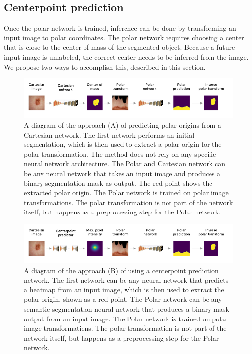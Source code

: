     \subsection{Centerpoint prediction}
    
Once the polar network is trained, inference can be done by transforming an input image to polar 
coordinates. The polar network requires choosing a center that is close to the center of mass of the 
segmented object. Because a future input image is unlabeled, the correct center needs to be inferred from 
the image. We propose two ways to accomplish this, described in this section.
	
	\pagebreak

	\begin{figure}[h!]
		\centering
		\includegraphics[width=\linewidth]{images/4/retraining-approach}
		\caption{A diagram of the approach (A) of predicting polar origins from a Cartesian network. The first network performs an initial segmentation, which is then used to extract a polar origin for the polar transformation. The method does not rely on any specific neural network architecture. The Polar and Cartesian network can be any neural network that takes an input image and produces a binary segmentation mask as output. The red point shows the extracted polar origin. The Polar network is trained on polar image transformations. The polar transformation is not part of the network itself, but happens as a preprocessing step for the Polar network. \cite{bencevicTrainingPolarImage2021}}
		\label{fig:retraining-diagram}
	\end{figure}
	
		\begin{figure}[h]
		\centering
		\includegraphics[width=\linewidth]{images/4/centerpoint-approach}
		\caption{A diagram of the approach (B) of using a centerpoint prediction network. The first network can be any neural network that predicts a heatmap from an input image, which is then used to extract the polar origin, shown as a red point. The Polar network can be any semantic segmentation neural network that produces a binary mask output from an input image. The Polar network is trained on polar image transformations. The polar transformation is not part of the network itself, but happens as a preprocessing step for the Polar network. \cite{bencevicTrainingPolarImage2021}}
		\label{fig:centerpoint-approach}
	\end{figure}

